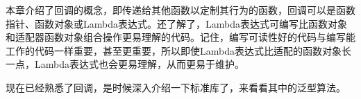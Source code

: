 本章介绍了回调的概念，即传递给其他函数以定制其行为的函数，回调可以是函数指针、函数对象或Lambda表达式。还了解了，Lambda表达式可编写比函数对象和适配器函数对象组合操作更易理解的代码。记住，编写可读性好的代码与编写能工作的代码一样重要，甚至更重要，所以即使Lambda表达式比适配的函数对象长一点，Lambda表达式也会更易理解，从而更易于维护。

现在已经熟悉了回调，是时候深入介绍一下标准库了，来看看其中的泛型算法。
